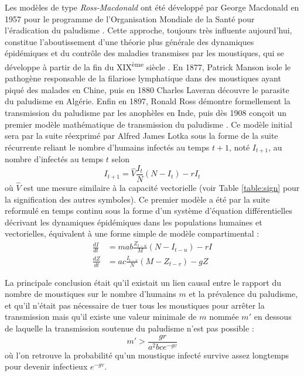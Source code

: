 Les modèles de type {\em Ross-Macdonald} ont été développé par George Macdonald en 1957 pour le programme de l'Organisation Mondiale de la Santé pour l'éradication du paludisme \cite{macdonald1957epidemiology}. 
Cette approche, toujours très influente aujourd'hui, constitue l'aboutissement d'une théorie plus générale des dynamiques épidémiques et du contrôle des maladies transmises par les moustiques, qui se développe à partir de la fin du XIX\textsuperscript{ème} siècle \cite{smith2012ross}.
En 1877, Patrick Manson isole le pathogène responsable de la filariose lymphatique dans des moustiques ayant piqué des malades en Chine, puis en 1880 Charles Laveran découvre le parasite du paludisme en Algérie.
Enfin en 1897, Ronald Ross démontre formellement la transmission du paludisme par les anophèles en Inde, puis dès 1908 conçoit un premier modèle mathématique de transmission du paludisme \cite{ross1908report}.
Ce modèle initial sera par la suite réexprimé par Alfred James Lotka sous la forme de la suite récurrente reliant le nombre d'humains infectés au temps $t+1$, noté $I_{t+1}$, au nombre d'infectés au temps $t$ selon
\begin{equation}
I_{t+1} = \hat{V}\frac{I_t}{N}(N-I_t)-rI_t
\end{equation}
où $\hat{V}$ est une mesure similaire à la capacité vectorielle (voir Table \ref{table:sign} pour la signification des autres symboles). 
Ce premier modèle a été par la suite reformulé en temps continu sous la forme d'un système d'équation différentielles décrivant les dynamiques épidémiques dans les populations humaines et vectorielles, équivalent à une forme simple de modèle compartimental \cite{ross1911prevention,lotka1923contribution} :
\begin{align}
\frac{dI}{dt} &= mab\frac{Z_{t-u}}{M}(N-I_{t-u})-rI \\ \nonumber
\frac{dZ}{dt} &= ac\frac{I_{t-v}}{N}(M-Z_{t-v})-gZ
\end{align}

La principale conclusion était qu'il existait un lien causal entre le rapport du nombre de moustiques sur le nombre d'humains $m$ et la prévalence du paludisme, et qu'il n'était pas nécessaire de tuer tous les moustiques pour arrêter la transmission mais qu'il existe une valeur minimale de $m$ nommée $m'$ en dessous de laquelle la transmission soutenue du paludisme n'est pas possible :
\begin{equation}
m'>\frac{gr}{a^2bce^{-gv}}
\end{equation}
où l'on retrouve la probabilité qu'un moustique infecté survive assez longtemps pour devenir infectieux $e^{-gv}$.

